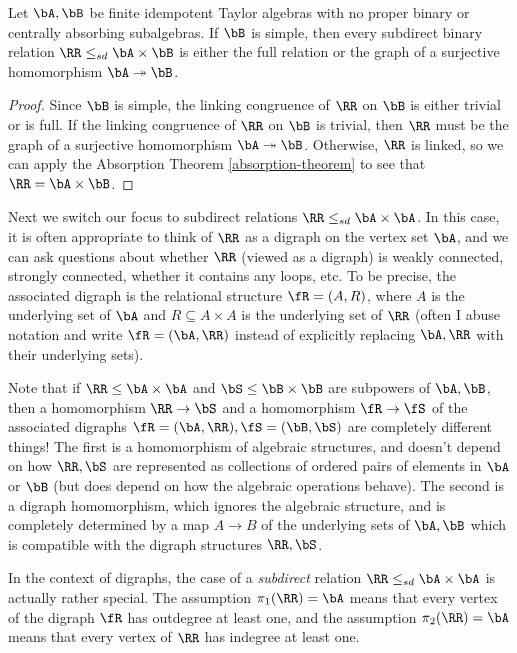 \begin{cor}\label{absorption-free-binary} Let $\bA, \bB$ be finite idempotent Taylor algebras with no proper binary or centrally absorbing subalgebras. If $\bB$ is simple, then every subdirect binary relation $\RR \le_{sd} \bA\times \bB$ is either the full relation or the graph of a surjective homomorphism $\bA \twoheadrightarrow \bB$.
\end{cor}
\begin{proof} Since $\bB$ is simple, the linking congruence of $\RR$ on $\bB$ is either trivial or is full. If the linking congruence of $\RR$ on $\bB$ is trivial, then $\RR$ must be the graph of a surjective homomorphism $\bA \twoheadrightarrow \bB$. Otherwise, $\RR$ is linked, so we can apply the Absorption Theorem \ref{absorption-theorem} to see that $\RR = \bA \times \bB$.
\end{proof}

Next we switch our focus to subdirect relations $\RR \le_{sd} \bA\times\bA$. In this case, it is often appropriate to think of $\RR$ as a digraph on the vertex set $\bA$, and we can ask questions about whether $\RR$ (viewed as a digraph) is weakly connected, strongly connected, whether it contains any loops, etc. To be precise, the associated digraph is the relational structure $\fR = (A,R)$, where $A$ is the underlying set of $\bA$ and $R \subseteq A\times A$ is the underlying set of $\RR$ (often I abuse notation and write $\fR = (\bA,\RR)$ instead of explicitly replacing $\bA,\RR$ with their underlying sets).

\begin{rem} Note that if $\RR \le \bA\times \bA$ and $\bS \le \bB\times \bB$ are subpowers of $\bA, \bB$, then a homomorphism $\RR \rightarrow \bS$ and a homomorphism $\fR \rightarrow \fS$ of the associated digraphs $\fR = (\bA,\RR), \fS = (\bB,\bS)$ are completely different things! The first is a homomorphism of algebraic structures, and doesn't depend on how $\RR,\bS$ are represented as collections of ordered pairs of elements in $\bA$ or $\bB$ (but does depend on how the algebraic operations behave). The second is a digraph homomorphism, which ignores the algebraic structure, and is completely determined by a map $A \rightarrow B$ of the underlying sets of $\bA,\bB$ which is compatible with the digraph structures $\RR,\bS$.
\end{rem}

In the context of digraphs, the case of a \emph{subdirect} relation $\RR \le_{sd} \bA \times \bA$ is actually rather special. The assumption $\pi_1(\RR) = \bA$ means that every vertex of the digraph $\fR$ has outdegree at least one, and the assumption $\pi_2(\RR) = \bA$ means that every vertex of $\RR$ has indegree at least one.

